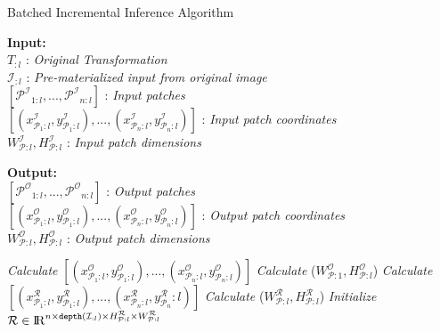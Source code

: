 \begin{algorithm}
    \caption{Batched Incremental Inference Algorithm}
    \label{alg:incinference}
    \begin{flushleft}
     \hspace*{1mm} \textbf{Input:} \\
     \hspace*{3mm} $T_{:l}$ : \textit{Original Transformation}\\
     \hspace*{3mm} $\mathcal{I}_{:l}$ : \textit{Pre-materialized input from original image}\\
     \hspace*{3mm} $[\mathcal{P^I}_{1:l},...,\mathcal{P^I}_{n:l}]$ : \textit{Input patches}\\
     \hspace*{3mm} $[(x^\mathcal{I}_{\mathcal{P}_1:l},y^\mathcal{I}_{\mathcal{P}_1:l}),...,(x^\mathcal{I}_{\mathcal{P}_n:l},y^\mathcal{I}_{\mathcal{P}_n:l})]$ : \textit{Input patch coordinates}\\
     \hspace*{3mm} $W^\mathcal{I}_{\mathcal{P}:l},H^\mathcal{I}_{\mathcal{P}:l}$ : \textit{Input patch dimensions}
    \end{flushleft}

    \begin{flushleft}
     \hspace*{1mm} \textbf{Output:}\\
     \hspace*{3mm} $[\mathcal{P^O}_{1:l},...,\mathcal{P^O}_{n:l}]$ : \textit{Output patches}\\
     \hspace*{3mm} $[(x^\mathcal{O}_{\mathcal{P}_1:l},y^\mathcal{O}_{\mathcal{P}_1:l}),...,(x^\mathcal{O}_{\mathcal{P}_n:l},y^\mathcal{O}_{\mathcal{P}_n:l})]$ : \textit{Output patch coordinates}\\
     \hspace*{3mm} $W^\mathcal{O}_{\mathcal{P}:l},H^\mathcal{O}_{\mathcal{P}:l}$ : \textit{Output patch dimensions}
    \end{flushleft}

    \begin{algorithmic}[1]
    \State \textit{Calculate} $[(x^\mathcal{O}_{\mathcal{P}_1:l},y^\mathcal{O}_{\mathcal{P}_1:l}),...,(x^\mathcal{O}_{\mathcal{P}_n:l},y^\mathcal{O}_{\mathcal{P}_n:l})]$ 
    \State \textit{Calculate} ($W^\mathcal{O}_{\mathcal{P}:1},H^\mathcal{O}_{\mathcal{P}:l}$)
    \State \textit{Calculate} $[(x^\mathcal{R}_{\mathcal{P}_1:l},y^\mathcal{R}_{\mathcal{P}_1:l}),...,(x^\mathcal{R}_{\mathcal{P}_n:l},y^\mathcal{R}_{\mathcal{P}_n}:l)]$
    \State \textit{Calculate} ($W^\mathcal{R}_{\mathcal{P}:l},H^\mathcal{R}_{\mathcal{P}:l}$)
    \State \textit{Initialize} $\mathcal{R} \in \mathcal{\rm I\!R}^{n \times \texttt{depth}(\mathcal{I}_{:l}) \times H^\mathcal{R}_{\mathcal{P}:l} \times W^\mathcal{R}_{\mathcal{P}:l}}$


\end{algorithmic}
\end{algorithm}
